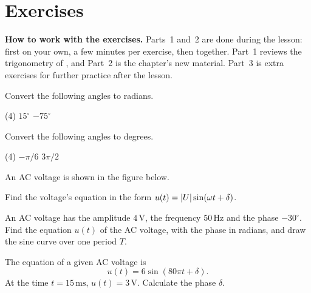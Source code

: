 
\section{Exercises}
\label{c10:sec:uppgifter}

\begin{aside}
\textbf{How to work with the exercises.} Parts~1 and~2 are done during the lesson: first on your
own, a few minutes per exercise, then together. Part~1 reviews the trigonometry of , and
Part~2 is the chapter's new material. Part~3 is extra exercises for further practice after the
lesson.

\end{aside}


Convert the following angles to radians.
\begin{delar}(4)
  \task $15^{\circ}$
  \task $-75^{\circ}$
\end{delar}

Convert the following angles to degrees.
\begin{delar}(4)
  \task $-\pi/6$
  \task $3\pi/2$
\end{delar}

An AC voltage is shown in the figure below.


Find the voltage's equation in the form $u(t) = \lvert U\rvert\sin(\omega t + \delta)$.

An AC voltage has the amplitude $4\,\text{V}$, the frequency $50\,\text{Hz}$ and the phase
$-30^{\circ}$. Find the equation $u(t)$ of the AC voltage, with the phase in radians, and draw the
sine curve over one period $T$.

The equation of a given AC voltage is
\[
  u(t) = 6\sin(80\pi t + \delta).
\]
At the time $t = 15\,\text{ms}$, $u(t) = 3\,\text{V}$. Calculate the phase $\delta$.


